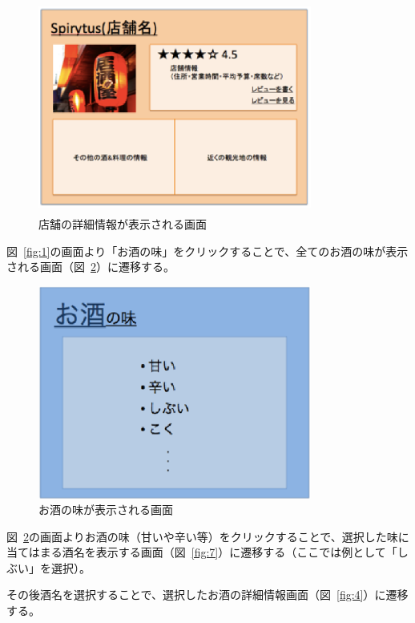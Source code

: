 \documentclass[a4j,titlepage]{jarticle}
\begin{document}
\begin {figure}[!htbp]
    \begin{center}
    \includegraphics [height=7cm, width=9cm]{5.eps}
    \caption {店舗の詳細情報が表示される画面}
    \label {fig:5}
    \end{center}
\end {figure}

図~\ref{fig:1}の画面より「お酒の味」をクリックすることで、全てのお酒の味が表示される画面（図~\ref{fig:6}）に遷移する。
\clearpage
\begin {figure}[!htbp]
    \begin{center}
    \includegraphics [height=7cm, width=9cm]{6.eps}
    \caption {お酒の味が表示される画面}
    \label {fig:6}
    \end{center}
\end {figure}
図~\ref{fig:6}の画面よりお酒の味（甘いや辛い等）をクリックすることで、選択した味に当てはまる酒名を表示する画面（図~\ref{fig:7}）に遷移する（ここでは例として「しぶい」を選択）。



その後酒名を選択することで、選択したお酒の詳細情報画面（図~\ref{fig:4}）に遷移する。
\end{document}
